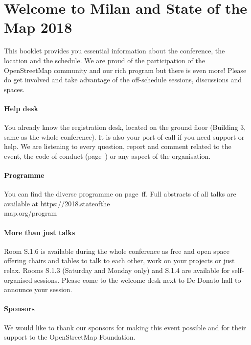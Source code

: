 \newpage
\enlargethispage{1\baselineskip}
\section*{Welcome to Milan and State of the Map 2018} \label{welcome}
This booklet provides you essential information
about the conference, the location and the schedule.  We are proud of the participation of the
OpenStreetMap community and our rich program but there is even more!  Please do get involved and
take advantage of the off-schedule sessions, discussions and spaces.

\paragraph*{Help desk} \label{welcome-helpdesk}
You already know the registration desk, located on the ground floor (Building 3, same as the whole
conference). It is also your port of call if you need support or help. We are listening to every
question, report and comment related to the event, the code of conduct (page~\pageref{coc}) or any
aspect of the organisation.

\paragraph*{Programme}
You can find the diverse programme on page~\pageref{saturday}ff. Full abstracts of all talks are available at https://2018.stateofthe\\map.org/program

\paragraph*{More than just talks} \label{welcome-location}
Room S.1.6 is available during the whole conference as free and open space offering chairs and tables
to talk to each other, work on your projects or just relax. Rooms S.1.3 (Saturday and Monday only) and S.1.4 are available for
self-organised sessions.  Please come to the welcome desk next to De Donato hall to announce your session.

\paragraph*{Sponsors} \label{welcome-sponsors}
We would like to thank our sponsors for making this event possible and for their support to the
OpenStreetMap Foundation.
\newpage
